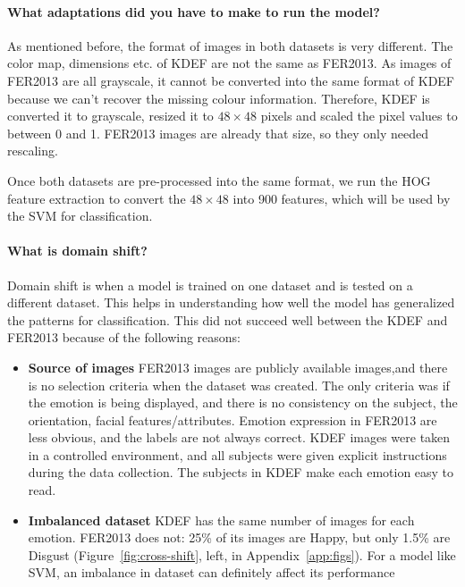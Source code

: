 \paragraph{What adaptations did you have to make to run the model?}
As mentioned before, the format of images in both datasets is very different.  The color map, dimensions etc. of KDEF are not the same as FER2013. As images of FER2013 are all grayscale, it cannot be converted into the same format of KDEF because we can't recover the missing colour information. Therefore, KDEF is converted it to grayscale, resized it to $48 \times 48$ pixels and scaled the pixel values to between 0 and 1. FER2013 images are already that size, so they only needed rescaling.

Once both datasets are pre-processed into the same format, we run the HOG feature extraction to convert the $48 \times 48$ into 900 features, which will be used by the SVM for classification.

\paragraph{What is domain shift?}
Domain shift is when a model is trained on one dataset and is tested on a different dataset. This helps in understanding how well the model has generalized the patterns for classification. This did not succeed well between the KDEF and FER2013 because of the following reasons:

\begin{itemize}

    \item \textbf{Source of images} FER2013 images are publicly available images,and there is no selection criteria when the dataset was created. The only criteria was if the emotion is being displayed, and there is no consistency on the subject, the orientation, facial features/attributes. Emotion expression in FER2013 are less obvious, and the labels are not always correct. KDEF images were taken in a controlled environment, and all subjects were given explicit instructions during the data collection. The subjects in KDEF make each emotion easy to read.
    \item \textbf{Imbalanced dataset} KDEF has the same number of images for each emotion. FER2013 does not: 25\% of its images are Happy, but only 1.5\% are Disgust (Figure~\ref{fig:cross-shift}, left, in Appendix~\ref{app:figs}). For a model like SVM, an imbalance in dataset can definitely affect its performance
\end{itemize}


